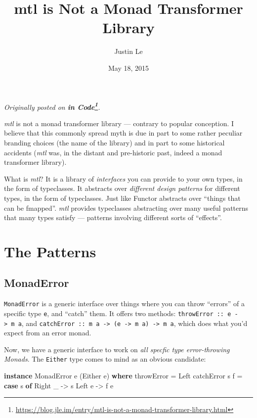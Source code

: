 \documentclass[]{article}
\title{mtl is Not a Monad Transformer Library}
\author{Justin Le}
\date{May 18, 2015}
\newenvironment{Shaded}{}{}
\newcommand{\KeywordTok}[1]{\textcolor[rgb]{0.00,0.44,0.13}{\textbf{{#1}}}}
\newcommand{\DataTypeTok}[1]{\textcolor[rgb]{0.56,0.13,0.00}{{#1}}}
\newcommand{\OtherTok}[1]{\textcolor[rgb]{0.00,0.44,0.13}{{#1}}}
\newcommand{\FunctionTok}[1]{\textcolor[rgb]{0.02,0.16,0.49}{{#1}}}
\newcommand{\NormalTok}[1]{{#1}}
\renewcommand{\href}[2]{#2\footnote{\url{#1}}}
\begin{document}
\maketitle

\emph{Originally posted on
\textbf{\href{https://blog.jle.im/entry/mtl-is-not-a-monad-transformer-library.html}{in
Code}}.}

\emph{mtl} is not a monad transformer library --- contrary to popular
conception. I believe that this commonly spread myth is due in part to
some rather peculiar branding choices (the name of the library) and in
part to some historical accidents (\emph{mtl} was, in the distant and
pre-historic past, indeed a monad transformer library).

What is \emph{mtl}? It is a library of \emph{interfaces} you can provide
to your own types, in the form of typeclasses. It abstracts over
\emph{different design patterns} for different types, in the form of
typeclasses. Just like Functor abstracts over ``things that can be
fmapped''. \emph{mtl} provides typeclasses abstracting over many useful
patterns that many types satisfy --- patterns involving different sorts
of ``effects''.

\section{The Patterns}\label{the-patterns}

\subsection{MonadError}\label{monaderror}

\texttt{MonadError} is a generic interface over things where you can
throw ``errors'' of a specific type \texttt{e}, and ``catch'' them. It
offers two methods: \texttt{throwError\ ::\ e\ -\textgreater{}\ m\ a},
and
\texttt{catchError\ ::\ m\ a\ -\textgreater{}\ (e\ -\textgreater{}\ m\ a)\ -\textgreater{}\ m\ a},
which does what you'd expect from an error monad.

Now, we have a generic interface to work on \emph{all specfic type
error-throwing Monads}. The \texttt{Either} type comes to mind as an
obvious candidate:

\begin{Shaded}
\begin{Highlighting}[]
\KeywordTok{instance} \DataTypeTok{MonadError} \NormalTok{e (}\DataTypeTok{Either} \NormalTok{e) }\KeywordTok{where}
    \NormalTok{throwError }\FunctionTok{=} \DataTypeTok{Left}
    \NormalTok{catchError s f }\FunctionTok{=} \KeywordTok{case} \NormalTok{s }\KeywordTok{of}
                       \DataTypeTok{Right} \NormalTok{_ }\OtherTok{->} \NormalTok{s}
                       \DataTypeTok{Left} \NormalTok{e  }\OtherTok{->} \NormalTok{f e}
\end{Highlighting}
\end{Shaded}
\end{document}
